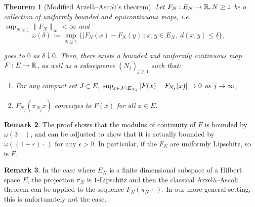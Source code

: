 \documentclass[10pt]{amsart}
\newtheorem{theo}{Theorem}[section]
\theoremstyle{definition}\newtheorem{defi}[theo]{Definition}\newtheorem{rema}[theo]{Remark}\newtheorem{exam}[theo]{Example}\newtheorem{exem}[theo]{Example}\newtheorem{nota}[theo]{Notation}
\theoremstyle{plain}
\newcommand{\R}{\mathbb{R}}
\renewcommand*{\to}{\mathchoice{\longrightarrow}{\rightarrow}{\rightarrow}{\rightarrow}}
\begin{document}
\begin{theo}[Modified Arzelà--Ascoli's theorem]\label{Th:Arzela}
Let $F_N:E_N\to\R, N\ge1$ be a collection of uniformly bounded and equicontinuous maps, i.e. $\sup_{N\geq 1} \|F_N\|_{\infty}<\infty$ and
\begin{equation}
\omega(\delta):= \sup_{N\geq 1}\big\{|F_N(x)-F_N(y)|: x,y\in E_N,\; d(x,y)\leq \delta\big\},
\end{equation}
\pagebreak{}

\noindent
goes to $0$ as $\delta \downarrow 0$. Then, there exists a bounded and uniformly continuous map $F:E\to\R$, as well as a subsequence $(N_j)_{j\geq 1}$ such that:
\begin{enumerate}
\item For any compact set $J\subset E$, $\sup_{x\in J\cap E_{N_j}} |F(x)-F_{N_j}(x)| \to 0$ as $j\to\infty$,
\item $F_{N_j}(\pi_{N_j} x)$ converges to $F(x)$ for all $x \in E$.
\end{enumerate}
\end{theo}
\begin{rema}
The proof shows that the modulus of continuity of $F$ is bounded by $\omega(3\,\cdot\,)$, and can be adjusted to show that it is actually bounded by $\omega((1+\epsilon)\cdot\,)$ for any $\epsilon>0$. In particular, if the $F_N$ are uniformly Lipschitz, so is $F$.
\end{rema}
\begin{rema}
In the case where $E_N$ is a finite dimensional subspace of a Hilbert space $E$, the projection $\pi_N$ is $1$-Lipschitz and then the classical Arzelà--Ascoli theorem can be applied to the sequence $F_N(\pi_N\,\cdot\,)$. In our more general setting, this is unfortunately not the case.
\end{rema}
\end{document}
